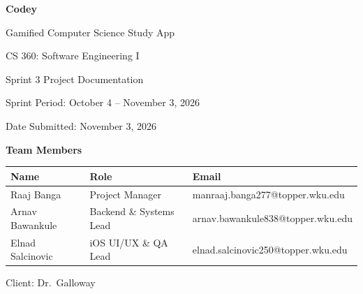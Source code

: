 \documentclass[12pt,letterpaper]{article}
\begin{document}
\begin{titlepage}
\begin{singlespace}
\centering
\vspace*{1.2in}
{\LARGE\bfseries Codey\par}
\vspace{0.25cm}
{\Large Gamified Computer Science Study App\par}
\vspace{1.2cm}
{\large CS 360: Software Engineering I\par}
\vspace{0.3cm}
{\large Sprint 3 Project Documentation\par}
\vspace{0.3cm}
{\large Sprint Period: October 4 -- November 3, 2026\par}
\vspace{0.3cm}
{\large Date Submitted: November 3, 2026\par}
\vspace{1.6cm}
{\large\bfseries Team Members\par}
\vspace{0.4cm}
\begin{tabular}{lll}
\toprule
\textbf{Name} & \textbf{Role} & \textbf{Email} \\
\midrule
Raaj Banga        & Project Manager            & manraaj.banga277@topper.wku.edu \\
Arnav Bawankule   & Backend \& Systems Lead    & arnav.bawankule838@topper.wku.edu \\
Elnad Salcinovic  & iOS UI/UX \& QA Lead       & elnad.salcinovic250@topper.wku.edu \\
\bottomrule
\end{tabular}
\vfill
{\large Client: Dr.\ Galloway\par}
\vspace{0.5in}
\end{singlespace}
\end{titlepage}

\setcounter{page}{2}
\begin{singlespace}
\tableofcontents
\clearpage
\listoffigures
\listoftables
\end{singlespace}
\clearpage
\end{document}
